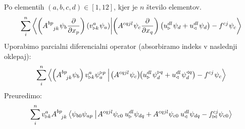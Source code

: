 Po elementih $(a,b,c,d) \in [1,12]$, kjer je $n$ število elementov.
\begin{equation}
   \sum^n_{i} \bra{
      \left(A^{bp}_{\phantom{bp}jk} \mkern1mu \psi_b \frac{\partial}{\partial x_p}\right)
      \left(v^a_{\triangleright k} \mkern1mu \psi_a\right)}
   \ket{
      \left(A^{cqjl} \mkern1mu \psi_c \frac{\partial}{\partial x_q}\right)
      \left(u^{dl}_\triangleright \mkern1mu \psi_d + u^{dl}_\triangleleft \mkern1mu \psi_d \right)
      -
      f^{cj} \mkern1mu \psi_c}
\end{equation}
Uporabimo parcialni diferencialni operator (absorbiramo indeks v naslednji oklepaj):
\begin{equation*}
   \sum^n_i \bra{
   \left( A^{bp}_{\mkern14mu jk} \psi_b \right)
   v^a_{\triangleright k} \psi^{\triangleright p}_a \mkern4mu}
   \ket{
      \mkern2mu \left(A^{cqjl} \mkern1mu \psi_c \right)
      \mkern-5mu \left(u^{dl}_\triangleright \mkern1mu \psi^{\triangleright q}_d
      +
      u^{dl}_\triangleleft \mkern1mu \psi^{\triangleleft q}_d \right)
      -
      f^{cj} \mkern1mu \psi_c}
\end{equation*}
Preuredimo:
\begin{equation*}
   \sum^n_i v^a_{\triangleright k} A^{bp}_{\mkern14mu jk} \bra{
      \psi_{b0}
      \psi_{ap} \mkern4mu}
   \ket{
      \mkern2mu
      A^{cqjl} \psi_{c0} \mkern4mu u^{dl}_\triangleright \psi_{dq}
      +
      A^{cqjl} \psi_{c0} \mkern4mu u^{dl}_\triangleleft \psi_{dq}
      -
      f^{cj}_{\bowtie} \psi_{c0}}
\end{equation*}

